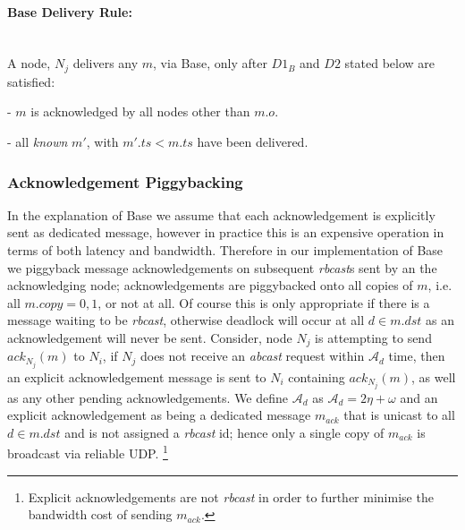     \paragraph{\textsf{Base} Delivery Rule:}\hspace{0pt} \\
        A node, $N_j$ delivers any $m$, via \textsf{Base}, only after $D1_B$ and $D2$ stated below are satisfied:
        \begin{description}[labelindent=1cm]
            \item[$\boldsymbol{D1_B}$] - $m$ is acknowledged by all nodes other than $m.o$. 
            \item[$\boldsymbol{D2}$] - all \emph{known} $m'$, with $m'.ts < m.ts$ have been delivered.
        \end{description}
    
    \subsubsection*{Acknowledgement Piggybacking}\label{ssec:base_ack_piggyback}
    In the explanation of \textsf{Base} we assume that each acknowledgement is explicitly sent as dedicated message, however in practice this is an expensive operation in terms of both latency and bandwidth.  Therefore in our implementation of \textsf{Base} we piggyback message acknowledgements on subsequent \emph{rbcast}s sent by an the acknowledging node; acknowledgements are piggybacked onto all copies of $m$, i.e. all $m.copy =0, 1$, or not at all.  Of course this is only appropriate if there is a message waiting to be \emph{rbcast}, otherwise deadlock will occur at all $d \in m.dst$ as an acknowledgement will never be sent.  Consider, node $N_j$ is attempting to send $ack_{N_j}(m)$ to $N_i$, if $N_j$ does not receive an \emph{abcast} request within $\mathcal{A}_d$ time, then an explicit acknowledgement message is sent to $N_i$ containing $ack_{N_j}(m)$, as well as any other pending acknowledgements.  We define $\mathcal{A}_d$ as $\mathcal{A}_d = 2\eta + \omega$ and an explicit acknowledgement as being a dedicated message $m_{ack}$ that is unicast to all $d \in m.dst$ and is not assigned a \emph{rbcast} id; hence only a single copy of $m_{ack}$ is broadcast via reliable UDP.  \footnote{Explicit acknowledgements are not \emph{rbcast} in order to further minimise the bandwidth cost of sending $m_{ack}$.}
    
